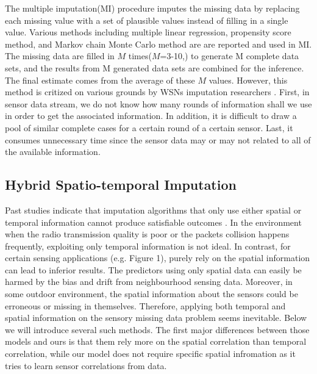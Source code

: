The multiple imputation(MI) procedure\cite{yuan2000multiple} imputes the missing data by replacing each missing value with a set of plausible values instead of filling in a single value. Various methods including multiple linear regression, propensity score method, and Markov chain Monte Carlo method are are reported and used in MI. The missing data are filled in $M$ times($M$=3-10,\cite{Little:hotdeck}) to generate M complete data sets, and the results from M generated data sets are combined for the inference\cite{yuan2000multiple}. The final estimate comes from the average of these $M$ values. 
However, this method is critized on various grounds by WSNs imputation researchers\cite{jiang2007estimating} \cite{Gruenwald:FARM}. First, in sensor data stream, we do not know how many rounds of information shall we use in order to get the associated information.
In addition, it is difficult to draw a pool of similar complete cases for a certain round of a certain sensor. 
Last, it consumes unnecessary time since the sensor data may or may not related to all of the available information.



\subsection{Hybrid Spatio-temporal Imputation}    
Past studies indicate that imputation algorithms that only use either spatial or temporal information cannot produce satisfiable outcomes \cite{Lim:robust}. In the environment when the radio transmission quality is poor or the packets collision happens frequently, exploiting only temporal information is not ideal. In contrast, for certain sensing applications (e.g. Figure 1), purely rely on the spatial information can lead to inferior results. The predictors using only spatial data can easily be harmed by the bias and drift from neighbourhood sensing data. Moreover, in some outdoor environment, the spatial information about the sensors could be erroneous or missing in themselves. Therefore, applying both temporal and spatial information on the sensory missing data problem seems inevitable. 
Below we will introduce several such methods. The first major differences between those models and ours is that them rely more on the spatial correlation than temporal correlation, while our model does not require specific spatial infromation as it tries to learn sensor correlations from data.   


